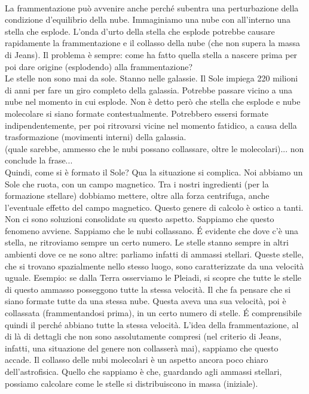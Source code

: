 \documentclass[a4paper,11pt]{article}
\begin{document}
    \\
La frammentazione può avvenire anche perché subentra una perturbazione della condizione d'equilibrio della nube. Immaginiamo una nube con all'interno una stella che esplode. L'onda d'urto della stella che esplode potrebbe causare rapidamente la frammentazione e il collasso della nube (che non supera la massa di Jeans). Il problema è sempre: come ha fatto quella stella a nascere prima per poi dare origine (esplodendo) alla frammentazione? \\ Le stelle non sono mai da sole. Stanno nelle galassie. Il Sole impiega 220 milioni di anni per fare un giro completo della galassia. Potrebbe passare vicino a una nube nel momento in cui esplode. Non è detto però che stella che esplode e nube molecolare si siano formate contestualmente. Potrebbero essersi formate indipendentemente, per poi ritrovarsi vicine nel momento fatidico, a causa della trasformazione (movimenti interni) della galassia. \\(quale sarebbe, ammesso che le nubi possano collassare, oltre le molecolari)... non conclude la frase...\\ Quindi, come si è formato il Sole? Qua la situazione si complica. Noi abbiamo un Sole che ruota, con un campo magnetico. Tra i nostri ingredienti (per la formazione stellare) dobbiamo mettere, oltre alla forza centrifuga, anche l'eventuale effetto del campo magnetico. Questo genere di calcolo è ostico a tanti. Non ci sono soluzioni consolidate su questo aspetto. Sappiamo che questo fenomeno avviene. Sappiamo che le nubi collassano. \'E evidente che dove c'è una stella, ne ritroviamo sempre un certo numero. Le stelle stanno sempre in altri ambienti dove ce ne sono altre: parliamo infatti di ammassi stellari. Queste stelle, che si trovano spazialmente nello stesso luogo, sono caratterizzate da una velocità uguale. Esempio: se dalla Terra osserviamo le Pleiadi, si scopre che tutte le stelle di questo ammasso posseggono tutte la stessa velocità. Il che fa pensare che si siano formate tutte da una stessa nube. Questa aveva una sua velocità, poi è collassata (frammentandosi prima), in un certo numero di stelle. \'E comprensibile quindi il perché abbiano tutte la stessa velocità. L'idea della frammentazione, al di là di dettagli che non sono assolutamente compresi (nel criterio di Jeans, infatti, una situazione del genere non collasserà mai), sappiamo che questo accade. Il collasso delle nubi molecolari è un aspetto ancora poco chiaro dell'astrofisica. Quello che sappiamo è che, guardando agli ammassi stellari, possiamo calcolare come le stelle si distribuiscono in massa (iniziale). 
\end{document}
